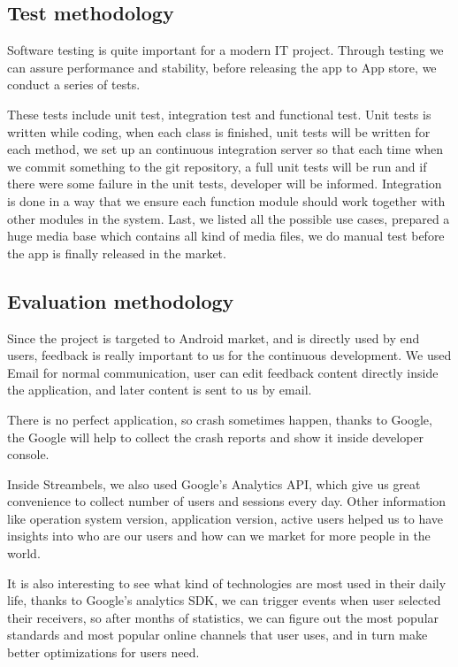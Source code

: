 \subsection{Test methodology}
Software testing is quite important for a modern IT project. Through testing we
can assure performance and stability, before releasing the app to App store, we
conduct a series of tests.

These tests include unit test, integration test and functional test.
Unit tests is written while coding, when each class is finished, unit tests will
be written for each method, we set up an continuous integration server so that
each time when we commit something to the git repository, a full unit tests will
be run and if there were some failure in the unit tests, developer will be
informed. Integration is done in a way that we ensure each function module
should work together with other modules in the system. Last, we listed all the
possible use cases, prepared a huge media base which contains all kind of media
files, we do manual test before the app is finally released in the market.

\subsection{Evaluation methodology}
Since the project is targeted to Android market, and is directly used by
end users, feedback is really important to us for the continuous development. We
used Email for normal communication, user can edit feedback content directly
inside the application, and later content is sent to us by email.

There is no perfect application, so crash sometimes happen, thanks to Google,
the Google will help to collect the crash reports and show it inside developer
console.

Inside Streambels, we also used Google's Analytics API, which give us
great convenience to collect number of users and sessions every day. Other
information like operation system version, application version, active users
helped us to have insights into who are our users and how can we market for more
people in the world.

It is also interesting to see what kind of technologies are most used in their
daily life, thanks to Google's analytics SDK, we can trigger events when user
selected their receivers, so after months of statistics, we can figure out the
most popular standards and most popular online channels that user uses, and in
turn make better optimizations for users need.


